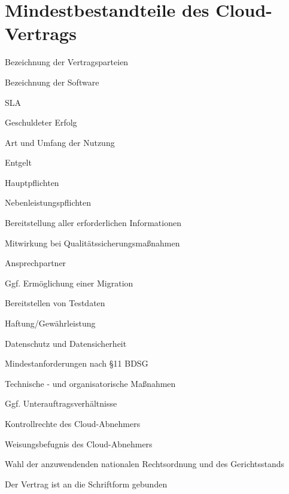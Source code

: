 \section{Mindestbestandteile des Cloud-Vertrags}
\begin{seList}
\item Bezeichnung der Vertragsparteien
\item Bezeichnung der Software
\item SLA
\item Geschuldeter Erfolg
\item Art und Umfang der Nutzung
\item Entgelt
\item Hauptpflichten
\item Nebenleistungspflichten
\begin{seList}                           
\item Bereitstellung aller erforderlichen Informationen
\item Mitwirkung bei Qualit\"atssicherungsma{\ss}nahmen
\item Ansprechpartner
\item Ggf. Erm\"oglichung einer Migration
\item Bereitstellen von Testdaten
\end{seList}     
\item Haftung/Gew\"ahrleistung
\item Datenschutz und Datensicherheit
\begin{seList}                           
\item Mindestanforderungen nach §11 BDSG
\item Technische - und organisatorische Ma{\ss}nahmen
\item Ggf. Unterauftragsverh\"altnisse
\item Kontrollrechte des Cloud-Abnehmers
\item Weisungsbefugnis des Cloud-Abnehmers
\end{seList}                           
\item Wahl der anzuwendenden nationalen Rechtsordnung und des Gerichtsstands
\item Der Vertrag ist an die Schriftform gebunden

\end{seList}


